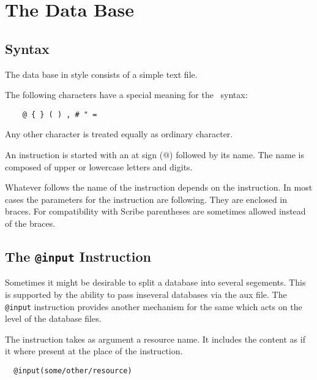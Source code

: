
\chapter{The Data Base}


\section{Syntax}

The data base in \BibTeX{} style consists of a
simple text file. 

The following characters have a special meaning for the \BibTeX\
syntax:
\begin{verbatim}
    @ { } ( ) , # " =
\end{verbatim}
Any other character is treated equally as ordinary character.

An instruction is started with an at sign (@) followed by its name.
The name is composed of upper or lowercase letters and digits.

Whatever follows the name of the instruction depends on the
instruction. In most cases the parameters for the instruction are
following. They are enclosed in braces. For compatibility with
Scribe parentheses are sometimes allowed instead of the
braces.


\section{The \texttt{@input} Instruction}%

Sometimes it might be desirable to split a database into several
segements. This is supported by the ability to pass inseveral
databases via the aux file. The \texttt{@input} instruction provides
another mechanism for the same which acts on the level of the database
files. \IM{x1}

The instruction takes as argument a resource name. It includes the
content as if it where present at the place of the instruction.

\begin{verbatim}
  @input(some/other/resource)
\end{verbatim}

